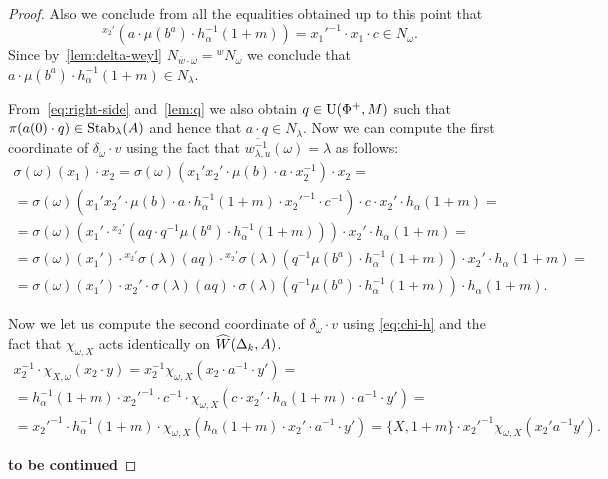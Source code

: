 \begin{proof}
 Also we conclude from all the equalities obtained up to this point that
 \begin{equation} {}^{x_2'}(a \cdot \mu(b^a) \cdot h_\alpha^{-1}(1+m)) = {x_1'}^{-1} \cdot x_1 \cdot c \in N_\omega. \end{equation}
 Since by~\cref{lem:delta-weyl} $N_{\overline{w} \cdot \omega} = {}^w{N_\omega}$ we conclude that
  $a \cdot \mu(b^a) \cdot h_\alpha^{-1}(1+m) \in {N_{\lambda}}$.

 From~\eqref{eq:right-side} and~\cref{lem:q} we also obtain $q \in \operatorname{U}(\Phi^+, M)$ such that $\pi(a(0) \cdot q) \in \operatorname{Stab}_\lambda(A)$ and hence
     that $a \cdot q \in N_\lambda$.
 Now we can compute the first coordinate of $\delta_\omega \cdot v$ using the fact that $\overline{w_{\lambda, u}^{-1}}(\omega) = \lambda$ as follows:
 \begin{multline*}
  \sigma(\omega)(x_1) \cdot x_2 = \sigma(\omega)(x_1'x_2' \cdot \mu(b) \cdot a \cdot x_2^{-1}) \cdot x_2 = \\
   = \sigma(\omega)(x_1'x_2' \cdot \mu(b) \cdot a \cdot h^{-1}_\alpha(1+m) \cdot {x_2'}^{-1} \cdot c^{-1}) \cdot c \cdot x_2' \cdot h_{\alpha}(1+m) = \\
   = \sigma(\omega)\left(x_1'\cdot {}^{x_2'} (aq \cdot q^{-1} \mu(b^a) \cdot h^{-1}_\alpha(1+m))\right) \cdot x_2' \cdot h_{\alpha}(1+m) = \\
   = \sigma(\omega)(x_1') \cdot {}^{x_2'}\sigma(\lambda)(aq) \cdot {}^{x_2'}\sigma(\lambda)(q^{-1} \mu(b^a) \cdot h^{-1}_\alpha(1+m)) \cdot x_2' \cdot h_{\alpha}(1+m) = \\
   = \sigma(\omega)(x_1') \cdot x_2' \cdot \sigma(\lambda)(aq) \cdot \sigma(\lambda)(q^{-1} \mu(b^a) \cdot h^{-1}_\alpha(1+m)) \cdot h_{\alpha}(1+m).
 \end{multline*}

 Now we let us compute the second coordinate of $\delta_\omega \cdot v$ using \eqref{eq:chi-h} and the fact that
 $\chi_{\omega, X}$ acts identically on $\widehat{W}(\Delta_k, A)$.
 \begin{multline*}
 x_2^{-1}\cdot \chi_{X, \omega}(x_2 \cdot y) = x_2^{-1}\chi_{\omega, X}(x_2 \cdot a^{-1} \cdot y') = \\
 = h_{\alpha}^{-1}(1 + m) \cdot {x_2'}^{-1} \cdot c^{-1} \cdot \chi_{\omega, X}(c \cdot x_2' \cdot h_{\alpha}(1 + m) \cdot a^{-1} \cdot y') = \\
 = {x_2'}^{-1} \cdot h_{\alpha}^{-1}(1 + m) \cdot \chi_{\omega, X}(h_{\alpha}(1 + m) \cdot x_2' \cdot a^{-1} \cdot y') = \{X, 1+m\} \cdot {x_2'}^{-1} \chi_{\omega, X}(x_2' a^{-1} y').
 \end{multline*}

    \textbf{to be continued}

 \end{proof}

